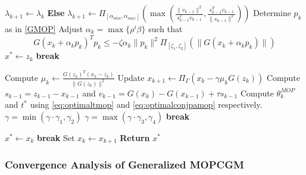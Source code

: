\documentclass{article}
\theoremstyle{remark}
\begin{document}
{\begin{algorithm}[H]
\begin{algorithmic}[1]
                \State $\lambda_{k+1} \gets \lambda_k$
                \State \textbf{Else}
                {$\lambda_{k+1} \gets \Pi_{[\alpha_{min}, \alpha_{max}]}(\max(\frac{\|v_{k-1}\|^2}{s_{k-1}^Tv_{k-1}}, \frac{s_{k-1}^Tv_{k-1}}{\|s_{k-1}\|^2}))$}
            \EndIf
            \State Determine $p_k$ as in \eqref{GMOP}
            \State Adjust $\alpha_k = \max \{ \rho^i \beta \}$ such that 
            \begin{equation}
                G(x_k + \alpha_k p_k)^T p_k \leq -\zeta \alpha_k \| p_k \|^2 \Pi_{[\zeta_1, \zeta_2]}(\|G(x_k + \alpha_k p_k)\|)
                \label{eq:backtrack}
            \end{equation}
                \State $x^* \gets z_k$
                \State \textbf{break}
            \EndIf
            
            \State Compute $\mu_k \gets \frac{G(z_k)^T (x_k - z_k)}{\| G(z_k) \|^2}$
            \State Update $x_{k+1} \gets \Pi_{\Gamma} (x_k - \gamma\mu_k G(z_k))$
            \State Compute $s_{k-1}=z_{k-1}-x_{k-1} $ and $v_{k-1}=G(x_{k})-G(x_{k-1})+\tau s_{k-1}$
            \State Compute $\theta_k^{MOP} $ and $t^*$ using \eqref{eq:optimaltmop}  and \eqref{eq:optimalconjpamop} respectively. 
    \State $\gamma = \min(\gamma \cdot \gamma_1, \gamma_2)$
\Else
    \State $\gamma = \max(\gamma \cdot \gamma_3, \gamma_4)$
    \State \textbf{break}
\EndIf

                \State $x^* \gets x_k$
                \State \textbf{break}
            \EndIf   
            \State Set $x_k \gets x_{k+1}$
        \EndWhile
        \State \textbf{Return} $x^*$
    \end{algorithmic}
\end{algorithm}
\renewcommand{\baselinestretch}{1.50}

}

\newpage

\subsubsection{Convergence Analysis of Generalized MOPCGM}
\label{GeneralizedConvergence}
\end{document}
